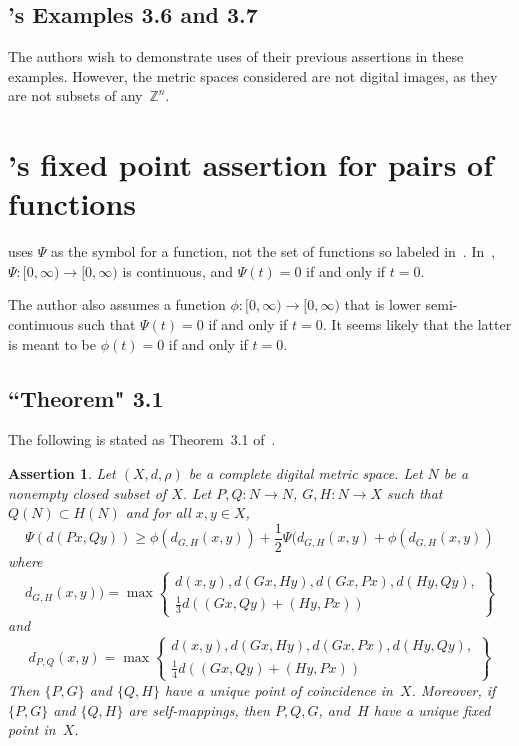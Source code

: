 \documentclass{article}
\newtheorem{assert}[thm]{Assertion}
\numberwithin{thm}{section}
\def\Z{{\mathbb Z}}
\begin{document}
\subsection{\cite{JyotiRani17}'s Examples 3.6 and 3.7}
The authors wish 
to demonstrate uses
of their previous
assertions in
these examples.
However, the 
metric spaces
considered are
not digital
images, as they
are not subsets
of any~$\Z^n$.

\section{\cite{Khan}'s fixed point
assertion for pairs of functions}

\cite{Khan}
uses $\Psi$ as the
symbol for a  function, not
the set of functions so labeled
in~\cite{JyotiRani17}. 
In~\cite{Khan},
$\Psi: [0,\infty) \to [0,\infty)$ is
continuous, and
$\Psi(t) = 0$ if
and only if $t=0$.

The author also assumes a
function $\phi: [0,\infty) \to [0,\infty)$ that is
lower semi-continuous such 
that $\Psi(t) = 0$ if
and only if $t=0$. It seems
likely that the latter is
meant to be $\phi(t) = 0$ if
and only if $t=0$.

\subsection{``Theorem" 3.1}
The following is
stated as Theorem~3.1
of~\cite{Khan}.

\begin{assert}
    Let $(X,d,\rho)$
    be a complete digital metric space.
    Let $N$ be a nonempty closed subset of $X$.
    Let $P,Q: N \to N$,
    $G,H: N \to X$ such that
    $Q(N) \subset H(N)$ and for all $x,y \in X$,
    \begin{equation}
    \label{Khan3.1ineq}
 \Psi(d(Px,Qy)) \ge
      \phi(d_{G,H}(x,y)) +
      \frac{1}{2}\Psi(d_{G,H}(x,y) + \phi(d_{G,H}(x,y))
    \end{equation}
    where
    \begin{equation} 
   \label{dGH}
    d_{G,H}(x,y)) = \max
    \left \{ \begin{array}{c}
    d(x,y), d(Gx,Hy), d(Gx,Px), 
    d(Hy,Qy), \\
    \frac{1}{3}d((Gx,Qy) + (Hy, Px))
    \end{array} 
    \right \} 
\end{equation}
and
\begin{equation}
    \label{dPQ}
    d_{P,Q}(x,y) =
    \max \left \{
    \begin{array}{c}
     d(x,y), d(Gx,Hy), d(Gx,Px), 
    d(Hy,Qy),    \\
    \frac{1}{4}d((Gx,Qy) +     (Hy,Px)) 
    \end{array}
    \right \}
\end{equation}
Then $\{P,G\}$
and $\{Q,H\}$ have a unique point of coincidence 
in~$X$. Moreover, if
$\{P,G\}$ and
$\{Q,H\}$ are self-mappings,
then $P,Q,G$,
and~$H$ have a
unique fixed point in~$X$.
\end{assert}
\end{document}
